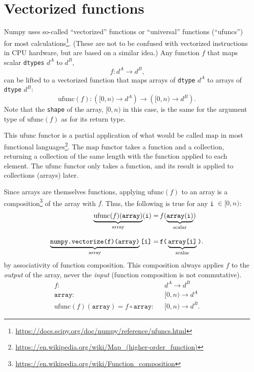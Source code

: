\documentclass[12pt]{article}
\begin{document}
\section*{Vectorized functions}

Numpy uses so-called ``vectorized'' functions or ``universal'' functions (``ufuncs'') for most calculations\footnote{\url{https://docs.scipy.org/doc/numpy/reference/ufuncs.html}}. (These are not to be confused with vectorized instructions in CPU hardware, but are based on a similar idea.) Any function $f$ that maps scalar \texttt{dtypes} $d^A$ to $d^B$,
\[ f: d^A \to d^B\mbox{,} \]
\noindent can be lifted to a vectorized function that maps arrays of \texttt{dtype} $d^A$ to arrays of \texttt{dtype} $d^B$:
\[ \mbox{ufunc}(f): \left([0, n) \to d^A\right) \to \left([0, n) \to d^B\right)\mbox{.} \]
\noindent Note that the \texttt{shape} of the array, $[0, n)$ in this case, is the same for the argument type of $\mbox{ufunc}(f)$ as for its return type.

This $\mbox{ufunc}$ functor is a partial application of what would be called $\mbox{map}$ in most functional languages\footnote{\url{https://en.wikipedia.org/wiki/Map_(higher-order_function)}}. The $\mbox{map}$ functor takes a function and a collection, returning a collection of the same length with the function applied to each element. The $\mbox{ufunc}$ functor only takes a function, and its result is applied to collections (arrays) later.

Since arrays are themselves functions, applying $\mbox{ufunc}(f)$ to an array is a composition\footnote{\url{https://en.wikipedia.org/wiki/Function_composition}} of the array with $f$. Thus, the following is true for any \texttt{i} $\in [0, n)$:
\begin{align*}
\underbrace{\mbox{ufunc}(f)(\texttt{array})}_{\mbox{\scriptsize array}}(\texttt{i}) = & \,f(\underbrace{\texttt{array}(\texttt{i})}_{\mbox{\scriptsize scalar}}) \\[0.5\baselineskip]
\underbrace{\texttt{numpy.vectorize(f)(array)}}_{\mbox{\scriptsize array}}\texttt{[i]} = & \,\texttt{f(}\underbrace{\texttt{array[i]}}_{\mbox{\scriptsize scalar}}\texttt{)}\mbox{.}
\end{align*}
\noindent by associativity of function composition. This composition always applies $f$ to the {\it output} of the array, never the {\it input} (function composition is not commutative).
\begin{align*}
f: & \mbox{ } d^A \to d^B \\
\texttt{array}: & \mbox{ } [0, n) \to d^A \\
\mbox{ufunc}(f)(\texttt{array}) = f \circ \texttt{array} : & \mbox{ } [0, n) \to d^B\mbox{.}
\end{align*}
\end{document}
